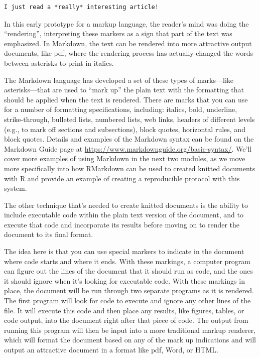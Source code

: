 \documentclass[]{tufte-book}
\begin{document}
\begin{verbatim}
I just read a *really* interesting article!
\end{verbatim}

In this early prototype for a markup language, the reader's mind was doing
the ``rendering'', interpreting these markers as a sign that part of the text
was emphasized. In Markdown, the text can be rendered into more attractive
output documents, like pdf, where the rendering process has actually
changed the words between asterisks to print in italics.

The Markdown language has developed a set of these types of marks---like
asterisks---that are used to ``mark up'' the plain text with the formatting
that should be applied when the text is rendered. There are marks that you
can use for a number of formatting specifications, including: italics,
bold, underline, strike-through, bulleted lists, numbered lists, web links,
headers of different levels (e.g., to mark off sections and subsections),
block quotes, horizontal rules, and block quotes. Details and examples of
the Markdown syntax can be found on the Markdown Guide page at
\url{https://www.markdownguide.org/basic-syntax/}. We'll cover more examples of
using Markdown in the next two modules, as we move more specifically into
how RMarkdown can be used to created knitted documents with R and provide
an example of creating a reproducible protocol with this system.

The other technique that's needed to create knitted documents is the ability to
include executable code within the plain text version of the document, and to
execute that code and incorporate its results before moving on to render the
document to its final format.

The idea here is that you can use special markers to indicate in the document
where code starts and where it ends. With these markings, a computer program can
figure out the lines of the document that it should run as code, and the ones it
should ignore when it's looking for executable code. With these markings in
place, the document will be run through two separate programs as it is rendered.
The first program will look for code to execute and ignore any other lines of
the file. It will execute this code and then place any results, like figures,
tables, or code output, into the document right after that piece of code. The
output from running this program will then be input into a more traditional
markup renderer, which will format the document based on any of the mark up
indications and will output an attractive document in a format like pdf,
Word, or HTML.
\end{document}
